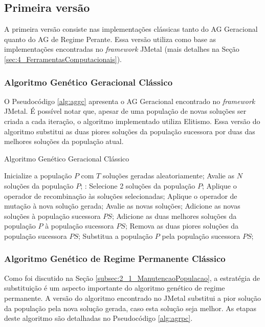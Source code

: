 \subsection{Primeira versão}
\label{subsec:3_PrimeiraVersao}
A primeira versão consiste nas implementações clássicas tanto do AG Geracional quanto do AG de Regime Perante. Essa versão utiliza como base as implementações encontradas no \textit{framework} JMetal (mais detalhes na Seção \ref{sec:4_FerramentasComputacionais}).

\subsubsection{Algoritmo Genético Geracional Clássico}
\label{subsec:3_AlgoritmoGeneticoGeracionalClassico}
O Pseudocódigo \ref{alg:aggc} apresenta o AG Geracional encontrado no \textit{framework} JMetal. É possível notar que, apesar de uma população de novas soluções ser criada a cada iteração, o algoritmo implementado utiliza Elitismo. Essa versão do algoritmo substitui as duas piores soluções da população sucessora por duas das melhores soluções da população atual.

\begin{algorithm}[!htbp]
  \caption{Algoritmo Genético Geracional Clássico}
  \label{alg:aggc}
  \begin{algorithmic}
    \State Inicialize a população $P$ com $T$ soluções geradas aleatoriamente;
    \State Avalie as $N$ soluções da população $P$;
       \State:
        \State Selecione 2 soluções da população $P$;
        \State Aplique o operador de recombinação às soluções selecionadas;
        \State Aplique o operador de mutação à nova solução gerada;
        \State Avalie as novas soluções;
        \State Adicione as novas soluções à população sucessora $PS$;
      \EndFor
      \State Adicione as duas melhores soluções da população $P$ à população sucessora $PS$;
      \State Remova as duas piores soluções da população sucessora $PS$;
      \State Substitua a população $P$ pela população sucessora $PS$;
    \EndWhile
  \end{algorithmic}
\end{algorithm}

\subsubsection{Algoritmo Genético de Regime Permanente Clássico}
\label{subsec:3_AlgoritmoGeneticoRegimePermanente}
Como foi discutido na Seção \ref{subsec:2_1_ManutencaoPopulacao}, a estratégia de substituição é um aspecto importante do algoritmo genético de regime permanente. A versão do algoritmo encontrado no JMetal substitui a pior solução da população pela nova solução gerada, caso esta solução seja melhor. As etapas deste algoritmo são detalhadas no Pseudocódigo \ref{alg:agrpc}.


